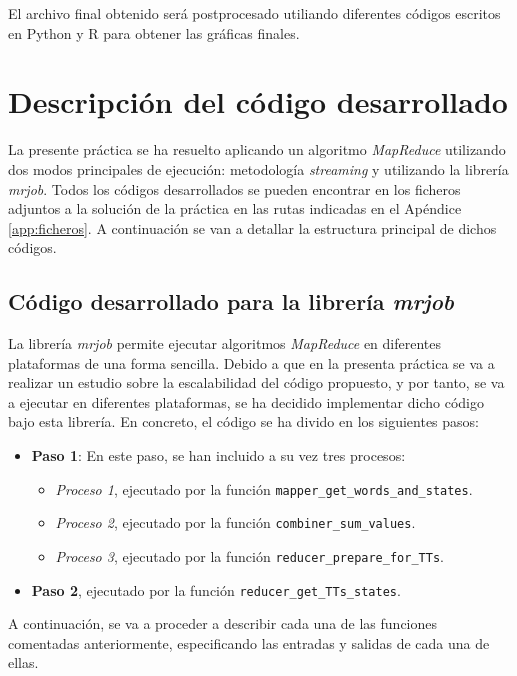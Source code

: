 \documentclass[10pt, spanish]{article}
\begin{document}
El archivo final obtenido será postprocesado utiliando diferentes códigos escritos en Python y R para obtener las gráficas finales.

\section{Descripción del código desarrollado}
\label{sec:codigo}

La presente práctica se ha resuelto aplicando un algoritmo \textit{MapReduce} utilizando dos modos principales de ejecución: metodología \textit{streaming} y utilizando la librería \textit{mrjob}. Todos los códigos desarrollados se pueden encontrar en los ficheros adjuntos a la solución de la práctica en las rutas indicadas en el Apéndice \ref{app:ficheros}. A continuación se van a detallar la estructura principal de dichos códigos.

\subsection{Código desarrollado para la librería \textit{mrjob}}
\label{subsec:codigo_mrjob}

La librería \textit{mrjob} permite ejecutar algoritmos \textit{MapReduce} en diferentes plataformas de una forma sencilla. Debido a que en la presenta práctica se va a realizar un estudio sobre la escalabilidad del código propuesto, y por tanto, se va a ejecutar en diferentes plataformas, se ha decidido implementar dicho código bajo esta librería. En concreto, el código se ha divido en los siguientes pasos:

\begin{itemize}
\item \textbf{Paso 1}: En este paso, se han incluido a su vez tres procesos:
\begin{itemize}
\item \textit{Proceso 1}, ejecutado por la función \texttt{mapper\_get\_words\_and\_states}.
\item \textit{Proceso 2}, ejecutado por la función \texttt{combiner\_sum\_values}.
\item \textit{Proceso 3}, ejecutado por la función \texttt{reducer\_prepare\_for\_TTs}.
\end{itemize}
\item \textbf{Paso 2}, ejecutado por la función \texttt{reducer\_get\_TTs\_states}.
\end{itemize}

A continuación, se va a proceder a describir cada una de las funciones comentadas anteriormente, especificando las entradas y salidas de cada una de ellas.
\end{document}
